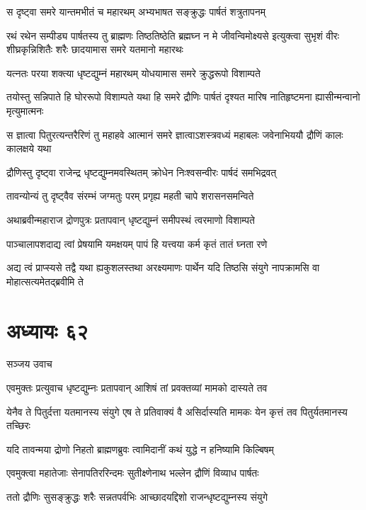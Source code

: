 \twolineshloka
{स दृष्ट्वा समरे यान्तमभीतं च महारथम्}
{अभ्यभाषत सङ्क्रुद्धः पार्षतं शत्रुतापनम्}


रथं रथेन सम्पीड्य पार्षतस्य तु ब्राह्मणः
\threelineshloka
{तिष्ठतिष्ठेति ब्रह्मघ्न न मे जीवन्विमोक्ष्यसे}
{इत्युक्त्वा सुभृशं वीरः शीघ्रकृन्निशितैः शरैः}
{छादयामास समरे यतमानो महारथः}


\twolineshloka
{यत्नतः परया शक्त्या धृष्टद्युम्नं महारथम्}
{योधयामास समरे क्रुद्धरूपो विशाम्पते}


तयोस्तु सन्निपाते हि घोररूपो विशाम्पते
\twolineshloka
{यथा हि समरे द्रौणिः पार्षतं दृश्यत मारिष}
{नातिहृष्टमना ह्यासीन्मन्वानो मृत्युमात्मनः}


\threelineshloka
{स ज्ञात्वा पितुरत्यन्तरैरिणं तु महाहवे}
{आत्मानं समरे ज्ञात्वाऽशस्त्रवध्यं महाबलः}
{जवेनाभिययौ द्रौणिं कालः कालक्षये यथा}


\twolineshloka
{द्रौणिस्तु दृष्ट्वा राजेन्द्र धृष्टद्युम्नमवस्थितम्}
{क्रोधेन निःश्वसन्वीरः पार्षदं समभिद्रवत्}


\twolineshloka
{तावन्योन्यं तु दृष्ट्वैव संरम्भं जग्मतुः परम्}
{प्रगृह्य महती चापे शरासनसमन्विते}


\twolineshloka
{अथाब्रवीन्महाराज द्रोणपुत्रः प्रतापवान्}
{धृष्टद्युम्नं समीपस्थं त्वरमाणो विशाम्पते}


\twolineshloka
{पाञ्चालापशदाद्य त्वां प्रेषयामि यमक्षयम्}
{पापं हि यत्त्वया कर्म कृतं तातं घ्नता रणे}


\threelineshloka
{अद्य त्वं प्राप्स्यसे तद्वै यथा ह्यकुशलस्तथा}
{अरक्ष्यमाणः पार्थेन यदि तिष्ठसि संयुगे}
{नापक्रामसि वा मोहात्सत्यमेतद्ब्रवीमि ते}


\chapter{अध्यायः ६२}
\twolineshloka
{सञ्जय उवाच}
{}


\twolineshloka
{एवमुक्तः प्रत्युवाच धृष्टद्युम्नः प्रतापवान्}
{आशिषं तां प्रवक्तव्यां मामको दास्यते तव}


\threelineshloka
{येनैव ते पितुर्दत्ता यतमानस्य संयुगे}
{एष ते प्रतिवाक्यं वै असिर्दास्यति मामकः}
{येन कृत्तं तव पितुर्यतमानस्य तच्छिरः}


\twolineshloka
{यदि तावन्मया द्रोणो निहतो ब्राह्मणब्रुवः}
{त्वामिदानीं कथं युद्धे न हनिष्यामि किल्बिषम्}


\twolineshloka
{एवमुक्त्वा महातेजाः सेनापतिररिन्दमः}
{सुतीक्ष्णेनाथ भल्लेन द्रौणिं विव्याध पार्षतः}


\twolineshloka
{ततो द्रौणिः सुसङ्क्रुद्धः शरैः सन्नतपर्वभिः}
{आच्छादयद्दिशो राजन्धृष्टद्युम्नस्य संयुगे}


